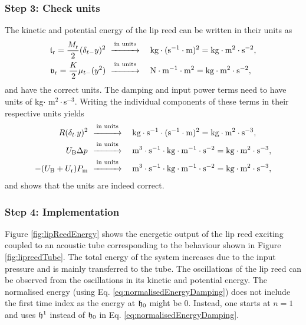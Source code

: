 \subsubsection{Step 3: Check units}
The kinetic and potential energy of the lip reed can be written in their units as
\begin{align*}
    \t_\rtxt = \frac{M_\text{r}}{2}(\delta_{t-}y)^2 &\ \overset{\text{in units}}{\xrightarrow{\hspace*{1cm}}} \quad\text{kg}\cdot(\text{s}^{-1}\cdot \text{m})^{2}= \text{kg}\cdot\text{m}^2\cdot\text{s}^{-2},\\
    \v_\rtxt = \frac{K}{2}\mu_{t-}(y^2)&\ \overset{\text{in units}}{\xrightarrow{\hspace*{1cm}}} \quad \text{N} \cdot \text{m}^{-1} \cdot \text{m}^2 = \text{kg}\cdot\text{m}^2\cdot\text{s}^{-2},
\end{align*}
and have the correct units. The damping and input power terms need to have units of kg$\cdot$ m$^2 \cdot $s$^{-3}$. Writing the individual components of these terms in their respective units yields
\begin{align*}
    R(\delta_{t\cdot} y)^2 &\ \overset{\text{in units}}{\xrightarrow{\hspace*{1cm}}} \quad\text{kg}\cdot\text{s}^{-1}\cdot(\text{s}^{-1}\cdot \text{m})^{2} = \text{kg} \cdot \text{m}^2 \cdot \text{s}^{-3} ,\\
    U_\text{B}\Delta p^{}&\ \overset{\text{in units}}{\xrightarrow{\hspace*{1cm}}} \quad \text{m}^3 \cdot \text{s}^{-1}\cdot \text{kg}\cdot \text{m}^{-1}\cdot \text{s}^{-2}= \text{kg} \cdot \text{m}^2 \cdot \text{s}^{-3},\\
    -(U_{\text{B}} + U_{\text{r}})P_{\text{m}}&\ \overset{\text{in units}}{\xrightarrow{\hspace*{1cm}}} \quad \text{m}^3 \cdot \text{s}^{-1}\cdot \text{kg}\cdot \text{m}^{-1}\cdot \text{s}^{-2}= \text{kg} \cdot \text{m}^2 \cdot \text{s}^{-3},
\end{align*}
and shows that the units are indeed correct.
\subsubsection{Step 4: Implementation}
Figure \ref{fig:lipReedEnergy} shows the energetic output of the lip reed exciting coupled to an acoustic tube corresponding to the behaviour shown in Figure \ref{fig:lipreedTube}. The total energy of the system increases due to the input pressure and is mainly transferred to the tube. The oscillations of the lip reed can be observed from the oscillations in its kinetic and potential energy. The normalised energy (using Eq. \eqref{eq:normalisedEnergyDamping}) does not include the first time index as the energy at $\mathfrak{h}_0$ might be 0. Instead, one starts at $n=1$ and uses $\mathfrak{h}^1$ instead of $\mathfrak{h}_0$ in Eq. \eqref{eq:normalisedEnergyDamping}.

